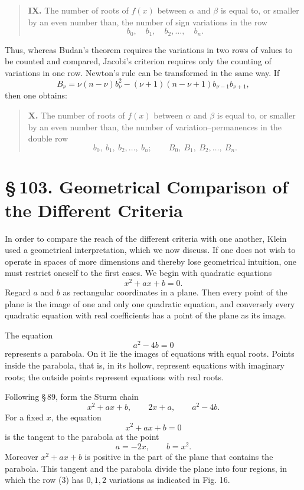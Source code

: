 \documentclass[11pt]{article}
\providecommand{\sect}[2]{\section*{\S\,#1. #2}}
\begin{document}
\begin{quote}
\textbf{IX.} The number of roots of $f(x)$ between $\alpha$ and $\beta$ is equal to, or smaller by an even number than, the number of sign variations in the row
\[
        b_0,\quad b_1,\quad b_2,\ldots,\quad b_n.
\]
\end{quote}

Thus, whereas Budan's theorem requires the variations in two rows of values to be counted and compared, Jacobi's criterion requires only the counting of variations in one row. Newton's rule can be transformed in the same way. If
\[
        B_\nu=\nu(n-\nu)b_\nu^2-(\nu+1)(n-\nu+1)b_{\nu-1}b_{\nu+1},
\]
then one obtains:

\begin{quote}
\textbf{X.} The number of roots of $f(x)$ between $\alpha$ and $\beta$ is equal to, or smaller by an even number than, the number of variation--permanences in the double row
\[
        b_0,\ b_1,\ b_2,\ldots,\ b_n;\qquad
        B_0,\ B_1,\ B_2,\ldots,\ B_n.
\]
\end{quote}

\sect{103}{Geometrical Comparison of the Different Criteria}

In order to compare the reach of the different criteria with one another, Klein used a geometrical interpretation, which we now discuss. If one does not wish to operate in spaces of more dimensions and thereby lose geometrical intuition, one must restrict oneself to the first cases. We begin with quadratic equations
\begin{equation}
        x^2+ax+b=0.
\tag{1}
\end{equation}
Regard $a$ and $b$ as rectangular coordinates in a plane. Then every point of the plane is the image of one and only one quadratic equation, and conversely every quadratic equation with real coefficients has a point of the plane as its image.

The equation
\begin{equation}
        a^2-4b=0
\tag{2}
\end{equation}
represents a parabola. On it lie the images of equations with equal roots. Points inside the parabola, that is, in its hollow, represent equations with imaginary roots; the outside points represent equations with real roots.

Following \S\,89, form the Sturm chain
\begin{equation}
        x^2+ax+b,\qquad 2x+a,\qquad a^2-4b.
\tag{3}
\end{equation}
For a fixed $x$, the equation
\[
        x^2+ax+b=0
\]
is the tangent to the parabola at the point
\[
        a=-2x,\qquad b=x^2.
\]
Moreover $x^2+ax+b$ is positive in the part of the plane that contains the parabola. This tangent and the parabola divide the plane into four regions, in which the row (3) has $0,1,2$ variations as indicated in Fig. 16.
\end{document}
